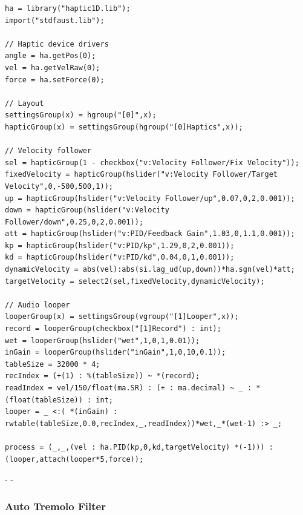 \documentclass[sigconf]{nimeart}
\begin{document}
\begin{Verbatim}[breaklines=true,breakanywhere=true,fontsize=\footnotesize]
ha = library("haptic1D.lib");
import("stdfaust.lib");

// Haptic device drivers
angle = ha.getPos(0);
vel = ha.getVelRaw(0);
force = ha.setForce(0);

// Layout
settingsGroup(x) = hgroup("[0]",x);
hapticGroup(x) = settingsGroup(hgroup("[0]Haptics",x));

// Velocity follower
sel = hapticGroup(1 - checkbox("v:Velocity Follower/Fix Velocity"));
fixedVelocity = hapticGroup(hslider("v:Velocity Follower/Target Velocity",0,-500,500,1));
up = hapticGroup(hslider("v:Velocity Follower/up",0.07,0,2,0.001));
down = hapticGroup(hslider("v:Velocity Follower/down",0.25,0,2,0.001));
att = hapticGroup(hslider("v:PID/Feedback Gain",1.03,0,1.1,0.001));
kp = hapticGroup(hslider("v:PID/kp",1.29,0,2,0.001));
kd = hapticGroup(hslider("v:PID/kd",0.04,0,1,0.001));
dynamicVelocity = abs(vel):abs(si.lag_ud(up,down))*ha.sgn(vel)*att;
targetVelocity = select2(sel,fixedVelocity,dynamicVelocity);

// Audio looper
looperGroup(x) = settingsGroup(vgroup("[1]Looper",x));
record = looperGroup(checkbox("[1]Record") : int);
wet = looperGroup(hslider("wet",1,0,1,0.01));
inGain = looperGroup(hslider("inGain",1,0,10,0.1));
tableSize = 32000 * 4;
recIndex = (+(1) : %(tableSize)) ~ *(record);
readIndex = vel/150/float(ma.SR) : (+ : ma.decimal) ~ _ : *(float(tableSize)) : int;
looper = _ <:( *(inGain) : rwtable(tableSize,0.0,recIndex,_,readIndex))*wet,_*(wet-1) :> _;

process = (_,_,(vel : ha.PID(kp,0,kd,targetVelocity) *(-1))) : (looper,attach(looper*5,force)); 
\end{Verbatim}

- -

\subsubsection{Auto Tremolo Filter}\label{auto-tremolo-filter-1}
\end{document}
